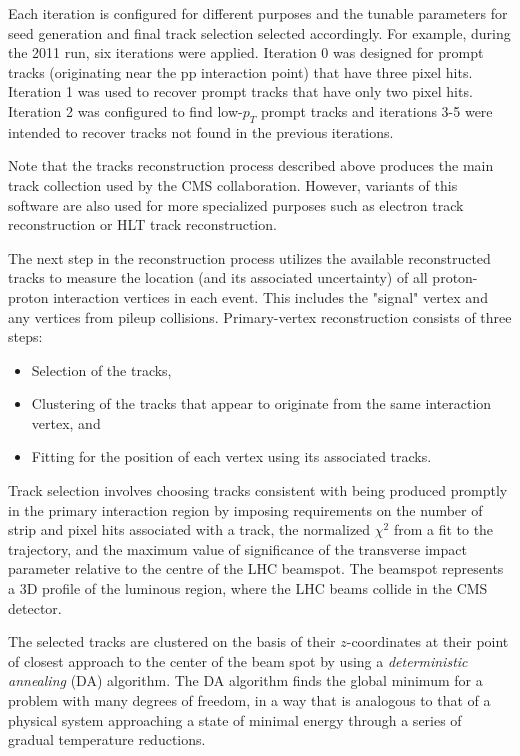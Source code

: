 Each iteration is configured for different purposes and the tunable parameters for seed generation and final track selection selected accordingly. For example, during the 2011 run, six iterations were applied. Iteration 0 was designed for prompt tracks (originating near the pp interaction point) that have three pixel hits. Iteration 1 was used to recover prompt tracks that have only two pixel hits. Iteration 2 was configured to find low-$p_{T}$ prompt tracks and iterations 3-5 were intended to recover tracks not found in the previous iterations.

Note that the tracks reconstruction process described above produces the main track collection used by the CMS collaboration. However, variants of this software are also used for more specialized purposes such as electron track reconstruction or HLT track reconstruction.

The next step in the reconstruction process utilizes the available reconstructed tracks to measure the location (and its associated uncertainty) of all proton-proton interaction vertices in each event. This includes the "signal" vertex and any vertices from pileup collisions. Primary-vertex reconstruction\cite{Speer:927395} consists of three steps:

\begin{itemize}
	\item Selection of the tracks,
	\item Clustering of the tracks that appear to originate from the same interaction vertex, and
	\item Fitting for the position of each vertex using its associated tracks.
\end{itemize}

Track selection involves choosing tracks consistent with being produced promptly in the primary interaction region by imposing requirements on the number of strip and pixel hits associated with a track, the normalized $\chi^{2}$ from a fit to the trajectory, and the maximum value of significance of the transverse impact parameter relative to the centre of the LHC beamspot. The beamspot represents a 3D profile of the luminous region, where the LHC beams collide in the CMS detector.

 The selected tracks are clustered on the basis of their $z$-coordinates at their point of closest approach to the center of the beam spot by using a \textit{deterministic annealing} (DA)\cite{726788} algorithm. The DA algorithm finds the global minimum for a problem with many degrees of freedom, in a way that is analogous to that of a physical system approaching a state of minimal energy through a series of gradual temperature reductions.

